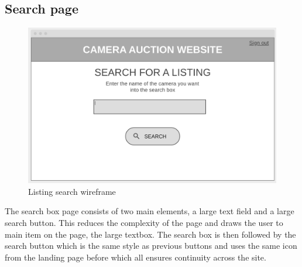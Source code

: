 \subsection{Search page}
\begin{figure}[H]
    \centering
    \includegraphics[scale=0.4]{ch2_design/wire_search.png}
    \caption{Listing search wireframe}
    \label{fig:wire_search}
\end{figure}
The search box page consists of two main elements, a large text field and a large search button. This reduces the complexity of the page and draws the user to main item on the page, the large textbox. The search box is then followed by the search button which is the same style as previous buttons and uses the same icon from the landing page before which all ensures continuity across the site.


